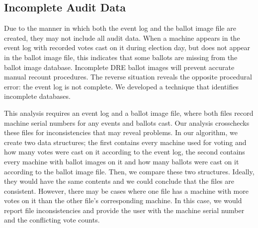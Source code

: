\subsection{Incomplete Audit Data}
Due to the manner in which both the event log and the ballot image
file are created, they may not include all audit data. When a machine
appears in the event log with recorded votes cast on it during
election day, but does not appear in the ballot image file, this
indicates that some ballots are missing from the ballot image
database. Incomplete DRE ballot images will prevent accurate manual
recount procedures. The reverse situation reveals the opposite
procedural error: the event log is not complete.  We developed a
technique that identifies incomplete databases.   

This analysis requires an event log and a ballot image file, where
both files record machine serial numbers for any events and ballots
cast.  Our analysis crosschecks these files for inconsistencies that
may reveal problems.  In our algorithm, we create two data structures;
the first contains every machine used for voting and how many votes
were cast on it according to the event log, the second contains every
machine with ballot images on it and how many ballots were cast on it
according to the ballot image file.  Then, we compare these two
structures.  Ideally, they would have the same contents and we could
conclude that the files are consistent.  However, there may be cases
where one file has a machine with more votes on it than the other
file's corresponding machine.  In this case, we would report file
inconsistencies and provide the user with the machine serial number
and the conflicting vote counts.      
